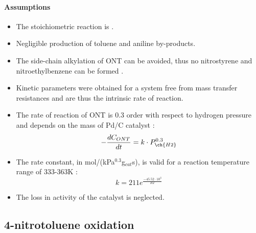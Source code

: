 \paragraph{Assumptions}
\begin{itemize}
    \item The stoichiometric reaction is  \cite{zhao_new_2016}.
    \item Negligible production of toluene and aniline by-products.  
    \item The side-chain alkylation of ONT can be avoided, thus no nitrostyrene and nitroethylbenzene can be formed \cite{zhao_new_2016}.
    \item Kinetic parameters were obtained for a system free from mass transfer resistances and are thus the intrinsic rate of reaction.
    \item The rate of reaction of ONT is 0.3 order with respect to hydrogen pressure and depends on the mass of Pd/C catalyst \cite{rajadhyaksha_solvent_1986}:
    \begin{equation}
    - \frac{dC_{ONT}}{dt}=k \cdot P_{\ch{H2}}^{0.3} 
    \end{equation}
    \item The rate constant, in mol/(kPa$^{0.3}$g$_{cat}$s), is valid for a reaction temperature range of 333-363K \cite{rajadhyaksha_solvent_1986}:
    \begin{equation}
        k=211e^{\frac{-45.52\cdot 10^{3}}{RT}}
    \end{equation}
    \item The loss in activity of the catalyst is neglected.
\end{itemize}

\subsection{4-nitrotoluene oxidation}
